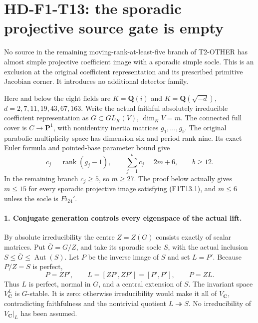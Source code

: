 \section[HD-F1-T13: sporadic source exclusion]{HD-F1-T13: the sporadic projective source gate is empty}
\label{sec:f1-sporadic-source-exclusion}

No source in the remaining moving-rank-at-least-five branch of
T2-OTHER has almost simple projective coefficient image with a
sporadic simple socle. This is an exclusion at the original
coefficient representation and its prescribed primitive Jacobian
corner. It introduces no additional detector family.

Here and below the eight fields are
\(K=\mathbf Q(i)\) and
\(K=\mathbf Q(\sqrt{-d})\),
\(d=2,7,11,19,43,67,163\). Write the actual faithful absolutely
irreducible coefficient representation as
\(G\subset GL_K(V)\), \(\dim_K V=m\). The connected full cover
is \(C\to\mathbf P^1\), with nonidentity inertia matrices
\(g_1,\ldots,g_b\). The original parabolic multiplicity space
has dimension six and period rank nine. Its exact Euler formula
and pointed-base parameter bound give
\[
 c_j=\operatorname{rank}(g_j-1),\qquad
 \sum_{j=1}^{b}c_j=2m+6,\qquad b\ge12.
 \tag{F1T13.1}
\]
In the remaining branch \(c_j\ge5\), so \(m\ge27\).
The proof below actually gives \(m\le15\) for every sporadic
projective image satisfying (F1T13.1), and \(m\le6\) unless
the socle is \(Fi_{24}'\).

\paragraph{1. Conjugate generation controls every eigenspace of the actual lift.}
By absolute irreducibility the centre \(Z=Z(G)\) consists
exactly of scalar matrices. Put \(\overline G=G/Z\), and take
its sporadic socle \(S\), with the actual inclusion
\(S\le\overline G\le\operatorname{Aut}(S)\).
Let \(P\) be the inverse image of \(S\) and set \(L=P'\).
Because \(P/Z=S\) is perfect,
\[
 P=ZP',\qquad
 L=[ZP',ZP']=[P',P'],\qquad P=ZL.
 \tag{F1T13.2}
\]
Thus \(L\) is perfect, normal in \(G\), and a central
extension of \(S\). The invariant space \(V_{\mathbf C}^L\)
is \(G\)-stable. It is zero: otherwise irreducibility would
make it all of \(V_{\mathbf C}\), contradicting faithfulness
and the nontrivial quotient \(L\twoheadrightarrow S\).
No irreducibility of \(V_{\mathbf C}|_L\) has been assumed.

